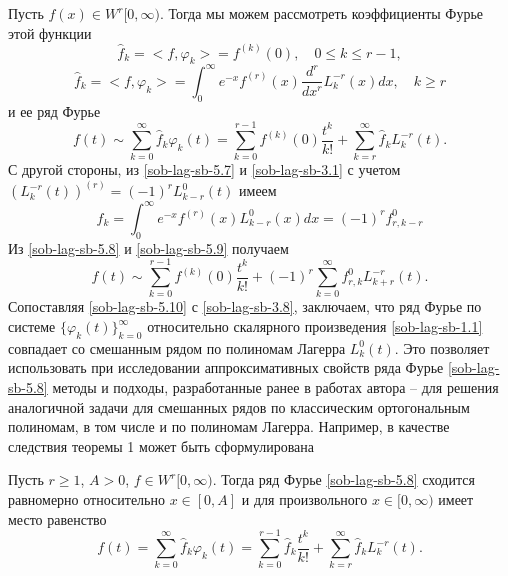 Пусть $f(x)\in W^r[0,\infty)$. Тогда  мы можем рассмотреть коэффициенты Фурье этой функции
\begin{equation}\label{sob-lag-sb-5.6}
\hat f_k= <f,\varphi_k>=f^{(k)}(0), \quad 0\le k\le r-1,
  \end{equation}
\begin{equation}\label{sob-lag-sb-5.7}
 \hat f_k= <f,\varphi_k>= \int_0^\infty e^{-x}f^{(r)}(x) \frac{d^r}{dx^r}L_{k}^{-r}(x)dx, \quad k\ge r
  \end{equation}
и ее ряд Фурье
\begin{equation}\label{sob-lag-sb-5.8}
f(t)\sim \sum_{k=0}^\infty \hat f_k\varphi_k(t)=  \sum_{k=0}^{r-1}f^{(k)}(0)\frac{t^k}{k!}+ \sum_{k=r}^\infty \hat f_k L_{k}^{-r}(t).
   \end{equation}
С другой стороны, из \eqref{sob-lag-sb-5.7} и \eqref{sob-lag-sb-3.1} с учетом  $\left(L_k^{-r}(t)\right)^{(r)}=(-1)^rL_{k-r}^{0}(t)$ имеем
\begin{equation}\label{sob-lag-sb-5.9}
 \hat f_k=  \int_0^\infty e^{-x}f^{(r)}(x) L_{k-r}^{0}(x)dx=(-1)^rf_{r,k-r}^0
  \end{equation}
 Из \eqref{sob-lag-sb-5.8} и \eqref{sob-lag-sb-5.9} получаем
\begin{equation}\label{sob-lag-sb-5.10}
f(t)\sim  \sum_{k=0}^{r-1}f^{(k)}(0)\frac{t^k}{k!}+(-1)^r\sum_{k=0}^\infty f_{r,k}^0L_{k+r}^{-r}(t) .
   \end{equation}
Сопоставляя \eqref{sob-lag-sb-5.10} с \eqref{sob-lag-sb-3.8}, заключаем, что ряд Фурье по системе $\{\varphi_k(t)\}_{k=0}^\infty$ относительно скалярного
произведения \eqref{sob-lag-sb-1.1} совпадает  со смешанным рядом по полиномам Лагерра $L_k^0(t)$.
 Это позволяет использовать при исследовании  аппроксимативных свойств ряда Фурье \eqref{sob-lag-sb-5.8} методы и подходы, разработанные ранее в работах автора \cite{Haar-Tcheb-Shar11} -- \cite{Haar-Tcheb-Shar16} для решения  аналогичной задачи для смешанных рядов по классическим ортогональным полиномам, в том числе и по полиномам Лагерра. Например, в качестве следствия теоремы 1 может быть  сформулирована
\begin{theorem}   Пусть  $r\ge1$,   $A>0$, $f\in W^r[0,\infty)$. Тогда  ряд Фурье \eqref{sob-lag-sb-5.8}  сходится равномерно относительно $x\in[0,A]$ и для   произвольного $x\in[0,\infty)$ имеет место равенство
\begin{equation}\label{sob-lag-sb-5.11}
f(t)= \sum_{k=0}^\infty \hat f_k\varphi_k(t)=  \sum_{k=0}^{r-1}\hat f_k\frac{t^k}{k!}+ \sum_{k=r}^\infty \hat f_k L_{k}^{-r}(t).
   \end{equation}



\end{theorem}









